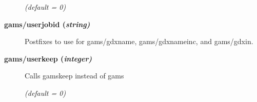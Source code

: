 \begin{description}
\textsl{(default = 0)}

\item[\label{scipuserjobid}\hypertarget{scipuserjobid}
{\textbf{gams/userjobid (\slshape{string})}}]\hspace{1.0in}

Postfixes to use for gams/gdxname, gams/gdxnameinc, and gams/gdxin.


\item[\label{scipuserkeep}\hypertarget{scipuserkeep}
{\textbf{gams/userkeep (\slshape{integer})}}]\hspace{1.0in}

Calls gamskeep instead of gams

\textsl{(default = 0)}

\end{description}

\chapterend
